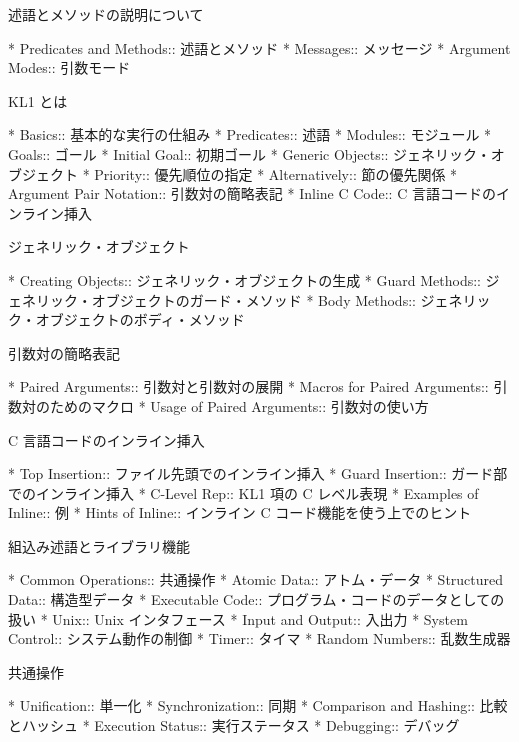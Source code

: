 述語とメソッドの説明について

* Predicates and Methods::      述語とメソッド
* Messages::                    メッセージ
* Argument Modes::              引数モード

KL1 とは

* Basics::                      基本的な実行の仕組み
* Predicates::                  述語
* Modules::                     モジュール
* Goals::                       ゴール
* Initial Goal::                初期ゴール
* Generic Objects::             ジェネリック・オブジェクト
* Priority::                    優先順位の指定
* Alternatively::               節の優先関係
* Argument Pair Notation::      引数対の簡略表記
* Inline C Code::               C 言語コードのインライン挿入

ジェネリック・オブジェクト

* Creating Objects::            ジェネリック・オブジェクトの生成
* Guard Methods::               ジェネリック・オブジェクトのガード・メソッド
* Body Methods::                ジェネリック・オブジェクトのボディ・メソッド

引数対の簡略表記

* Paired Arguments::            引数対と引数対の展開
* Macros for Paired Arguments:: 引数対のためのマクロ 
* Usage of Paired Arguments::   引数対の使い方

C 言語コードのインライン挿入

* Top Insertion::               ファイル先頭でのインライン挿入
* Guard Insertion::             ガード部でのインライン挿入
* C-Level Rep::                 KL1 項の C レベル表現
* Examples of Inline::          例
* Hints of Inline::             インライン C コード機能を使う上でのヒント

組込み述語とライブラリ機能

* Common Operations::           共通操作
* Atomic Data::                 アトム・データ
* Structured Data::             構造型データ
* Executable Code::             プログラム・コードのデータとしての扱い
* Unix::                        Unix インタフェース
* Input and Output::            入出力
* System Control::              システム動作の制御
* Timer::                       タイマ
* Random Numbers::              乱数生成器

共通操作

* Unification::                 単一化
* Synchronization::             同期
* Comparison and Hashing::      比較とハッシュ
* Execution Status::            実行ステータス
* Debugging::                   デバッグ

